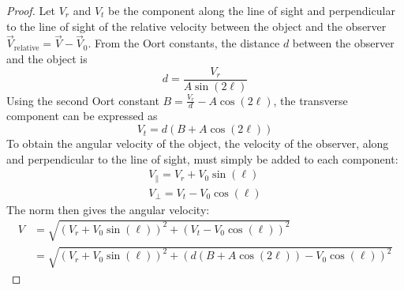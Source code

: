 \begin{proof}
    Let $V_r$ and $V_t$ be the component along the line of sight and perpendicular to the line of sight of the relative velocity between the object and the observer $\vec V_\textrm{relative} = \vec V - \vec V_0$. From the Oort constants, the distance $d$ between the observer and the object is
    \begin{equation}
        d = \frac{V_r}{A \sin(2\ell)}
    \end{equation}
    Using the second Oort constant $B = \frac{V_r}{d} - A \cos(2\ell)$, the transverse component can be expressed as
    \begin{equation}
        V_t = d (B + A \cos(2\ell))
    \end{equation}
    To obtain the angular velocity of the object, the velocity of the observer, along and perpendicular to the line of sight, must simply be added to each component:
    \begin{multline}
        V_{\parallel} = V_r + V_0 \sin(\ell) \\
        V_{\perp} = V_t - V_0 \cos(\ell)
    \end{multline}
    The norm then gives the angular velocity:
    \begin{equation}
        \begin{aligned}
            V &= \sqrt{(V_r + V_0 \sin(\ell))^2 + (V_t - V_0 \cos(\ell))^2} \\
            &= \sqrt{(V_r + V_0 \sin(\ell))^2 + (d (B + A \cos(2\ell)) - V_0 \cos(\ell))^2}
        \end{aligned}
    \end{equation}
\end{proof}